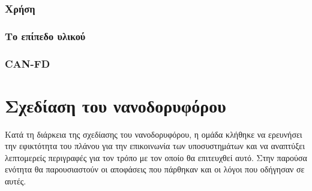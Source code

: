 \documentclass[a4paper,nobib,justified]{tufte-book}
\begin{document}
\subsection{Χρήση}
\subsection{Το επίπεδο υλικού}
\subsection{CAN-FD}

\chapter{Σχεδίαση του νανοδορυφόρου}
Κατά τη διάρκεια της σχεδίασης του νανοδορυφόρου, η ομάδα κλήθηκε να ερευνήσει την εφικτότητα του πλάνου για την επικοινωνία των υποσυστημάτων και να αναπτύξει λεπτομερείς περιγραφές για τον τρόπο με τον οποίο θα επιτευχθεί αυτό. Στην παρούσα ενότητα θα παρουσιαστούν οι αποφάσεις που πάρθηκαν και οι λόγοι που οδήγησαν σε αυτές.
\end{document}
